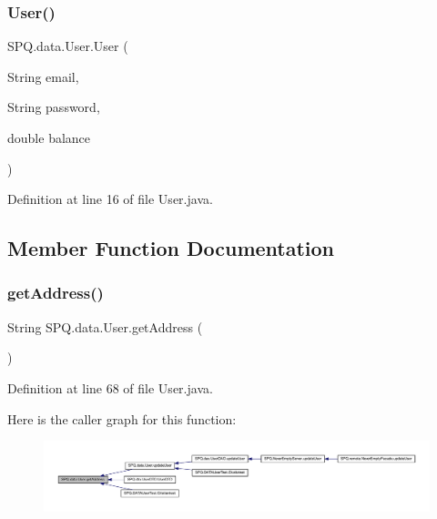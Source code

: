 \subsubsection{\texorpdfstring{User()}{User()}\hspace{0.1cm}{\footnotesize\ttfamily [5/5]}}
{\footnotesize\ttfamily S\+P\+Q.\+data.\+User.\+User (\begin{DoxyParamCaption}\item[{String}]{email,  }\item[{String}]{password,  }\item[{double}]{balance }\end{DoxyParamCaption})}



Definition at line 16 of file User.\+java.



\subsection{Member Function Documentation}
\mbox{\label{class_s_p_q_1_1data_1_1_user_a47d0065ad917d39d23acd62835575179}} 
\subsubsection{\texorpdfstring{get\+Address()}{getAddress()}}
{\footnotesize\ttfamily String S\+P\+Q.\+data.\+User.\+get\+Address (\begin{DoxyParamCaption}{ }\end{DoxyParamCaption})}



Definition at line 68 of file User.\+java.

Here is the caller graph for this function\+:
\nopagebreak
\begin{figure}[H]
\begin{center}
\leavevmode
\includegraphics[width=350pt]{class_s_p_q_1_1data_1_1_user_a47d0065ad917d39d23acd62835575179_icgraph}
\end{center}
\end{figure}
\mbox{\label{class_s_p_q_1_1data_1_1_user_a03cc880edbf4758b44318af1587824e5}} 
